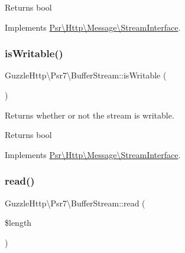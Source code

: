 \begin{DoxyReturn}{Returns}
bool 
\end{DoxyReturn}


Implements \hyperlink{interfacePsr_1_1Http_1_1Message_1_1StreamInterface_ad4a27548fd51bd12390d798981a1622b}{Psr\textbackslash{}\+Http\textbackslash{}\+Message\textbackslash{}\+Stream\+Interface}.

\mbox{\label{classGuzzleHttp_1_1Psr7_1_1BufferStream_a5d04843eba2948128ff79da1019a7034}} 
\subsubsection{\texorpdfstring{is\+Writable()}{isWritable()}}
{\footnotesize\ttfamily Guzzle\+Http\textbackslash{}\+Psr7\textbackslash{}\+Buffer\+Stream\+::is\+Writable (\begin{DoxyParamCaption}{ }\end{DoxyParamCaption})}

Returns whether or not the stream is writable.

\begin{DoxyReturn}{Returns}
bool 
\end{DoxyReturn}


Implements \hyperlink{interfacePsr_1_1Http_1_1Message_1_1StreamInterface_a79287940d75d1951b831879fdc493883}{Psr\textbackslash{}\+Http\textbackslash{}\+Message\textbackslash{}\+Stream\+Interface}.

\mbox{\label{classGuzzleHttp_1_1Psr7_1_1BufferStream_a7c5ee28064aec7dcf831845c3f7b18e7}} 
\subsubsection{\texorpdfstring{read()}{read()}}
{\footnotesize\ttfamily Guzzle\+Http\textbackslash{}\+Psr7\textbackslash{}\+Buffer\+Stream\+::read (\begin{DoxyParamCaption}\item[{}]{\$length }\end{DoxyParamCaption})}

